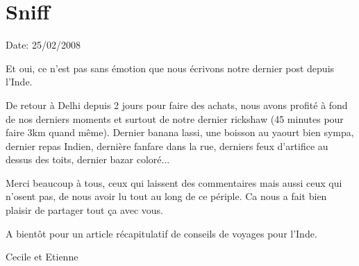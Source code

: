 \section{Sniff}

Date: 25/02/2008

\begin{multicols}{2}

Et oui, ce n'est pas sans émotion que nous écrivons notre dernier post depuis l'Inde.

De retour à Delhi depuis 2 jours pour faire des achats, nous avons profité à fond de nos derniers moments et surtout de notre dernier rickshaw (45 minutes pour faire 3km quand même). Dernier banana lassi, une boisson au yaourt bien sympa, dernier repas Indien, dernière fanfare dans la rue, derniers feux d'artifice au dessus des toits, dernier bazar coloré...

Merci beaucoup à tous, ceux qui laissent des commentaires mais aussi ceux qui n'osent pas, de nous avoir lu tout au long de ce périple. Ca nous a fait bien plaisir de partager tout ça avec vous.

A bientôt pour un article récapitulatif de conseils de voyages pour l'Inde.

Cecile et Etienne

\end{multicols}


